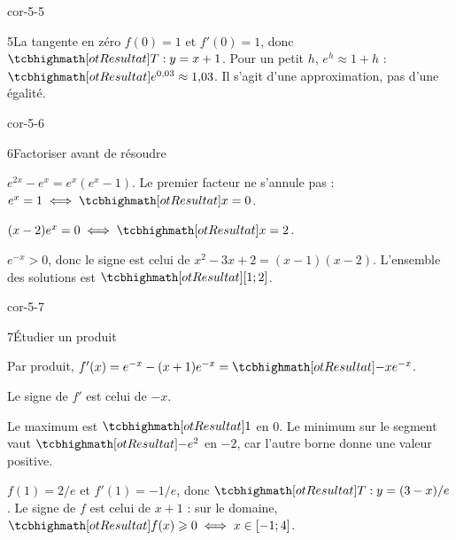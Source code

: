 \begin{blocLivre}{cor-5-5}
\begin{corrige}{5}{La tangente en zéro}
$f(0)=1$ et $f'(0)=1$, donc $\res{T:y=x+1}$.
Pour un petit $h$, $e^h\approx1+h$ : $\res{e^{0{,}03}\approx1{,}03}$.
Il s'agit d'une approximation, pas d'une égalité.
\end{corrige}
\end{blocLivre}
\begin{blocLivre}{cor-5-6}
\begin{corrige}{6}{Factoriser avant de résoudre}
\begin{questions}
\item $e^{2x}-e^x=e^x(e^x-1)$. Le premier facteur ne s'annule pas :
$e^x=1\iff\res{x=0}$.
\item $(x-2)e^x=0\iff\res{x=2}$.
\item $e^{-x}>0$, donc le signe est celui de
$x^2-3x+2=(x-1)(x-2)$. L'ensemble des solutions est $\res{[1;2]}$.
\end{questions}
\end{corrige}
\end{blocLivre}
\begin{blocLivre}{cor-5-7}
\begin{corrige}{7}{Étudier un produit}
\begin{questions}
\item Par produit, $f'(x)=e^{-x}-(x+1)e^{-x}=\res{-xe^{-x}}$.
\item Le signe de $f'$ est celui de $-x$.
\end{questions}
\begin{center}\begin{tableau}
\end{tableau}\end{center}
Le maximum est $\res{1}$ en 0. Le minimum sur le segment vaut $\res{-e^2}$ en $-2$,
car l'autre borne donne une valeur positive.
\par{}\enspace $f(1)=2/e$ et $f'(1)=-1/e$, donc
$\res{T:y=(3-x)/e}$. Le signe de $f$ est celui de $x+1$ : sur le domaine,
$\res{f(x)\geq0\iff x\in[-1;4]}$.
\end{corrige}
\end{blocLivre}
